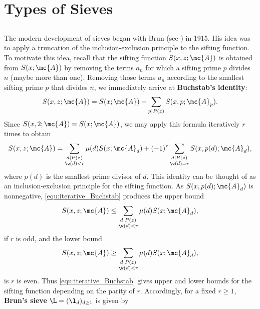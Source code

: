 \chapter{Types of Sieves}
  \section{}
    The modern development of sieves began with Brun (see \cite{brun1915uber}) in 1915. His idea was to apply a truncation of the inclusion-exclusion principle to the sifting function. To motivate this idea, recall that the sifting function $S(x,z;\mc{A})$ is obtained from $S(x;\mc{A})$ by removing the terms $a_{n}$ for which a sifting prime $p$ divides $n$ (maybe more than one). Removing those terms $a_{n}$ according to the smallest sifting prime $p$ that divides $n$, we immediately arrive at \textbf{Buchstab's identity}:
    \[
      S(x,z;\mc{A}) = S(x;\mc{A})-\sum_{p \mid P(z)}S(x,p;\mc{A}_{p}).
    \]
    Since $S(x,2;\mc{A}) = S(x;\mc{A})$, we may apply this formula iteratively $r$ times to obtain
    \begin{equation}\label{equ:iterative_Buchstab}
      S(x,z;\mc{A}) = \sum_{\substack{d \mid P(z) \\ \w(d) < r}}\mu(d)S(x;\mc{A}_{d})+(-1)^{r}\sum_{\substack{d \mid P(z) \\ \w(d) = r}}S(x,p(d);\mc{A}_{d}),
    \end{equation}
    where $p(d)$ is the smallest prime divisor of $d$. This identity can be thought of as an inclusion-exclusion principle for the sifting function. As $S(x,p(d);\mc{A}_{d})$ is nonnegative, \cref{equ:iterative_Buchstab} produces the upper bound
    \begin{equation}\label{equ:iterative_Buchstab_odd}
      S(x,z;\mc{A}) \le \sum_{\substack{d \mid P(z) \\ \w(d) < r}}\mu(d)S(x;\mc{A}_{d}),
    \end{equation}
    if $r$ is odd, and the lower bound
    \begin{equation}\label{equ:iterative_Buchstab_even}
      S(x,z;\mc{A}) \ge \sum_{\substack{d \mid P(z) \\ \w(d) < r}}\mu(d)S(x;\mc{A}_{d}),
    \end{equation}
    is $r$ is even. Thus \cref{equ:iterative_Buchstab} gives upper and lower bounds for the sifting function depending on the parity of $r$. Accordingly, for a fixed $r \ge 1$, \textbf{Brun's sieve} $\L = (\l_{d})_{d \ge 1}$ is given by
